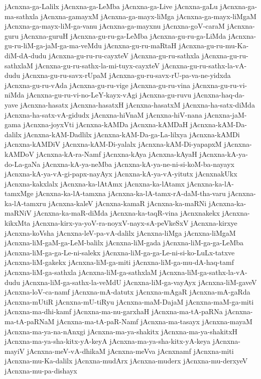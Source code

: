 {jAcnxna-ga-Lalilx
jAcnxna-ga-LeMba
jAcnxna-ga-Live
jAcnxna-gaLu
jAcnxna-ga-ma-sathxla
jAcnxna-gamayxM
jAcnxna-ga-mayx-liMga
jAcnxna-ga-mayx-liMgaM
jAcnxna-ga-mayx-liM-ga-vanu
jAcnxna-ga-mayxnu
jAcnxna-goV-caraM
jAcnxna-guru
jAcnxna-guruH
jAcnxna-gu-ru-ga-LeMba
jAcnxna-gu-ru-ga-LiMda
jAcnxna-gu-ru-liM-ga-jaM-ga-ma-veMdu
jAcnxna-gu-ru-maRtaH
jAcnxna-gu-ru-mu-Ka-diM-dA-dudu
jAcnxna-gu-ru-ru-cayxteV
jAcnxna-gu-ru-sathxla
jAcnxna-gu-ru-sathxlaM
jAcnxna-gu-ru-sathx-la-mi-tuyx-cayxteV
jAcnxna-gu-ru-sathx-la-vA-dudu
jAcnxna-gu-ru-savx-rUpaM
jAcnxna-gu-ru-savx-rU-pa-va-ne-yidxda
jAcnxna-gu-ru-vAda
jAcnxna-gu-ru-vige
jAcnxna-gu-ru-vina
jAcnxna-gu-ru-vi-niMda
jAcnxna-gu-ru-vi-no-LeY-kayx-vAgi
jAcnxna-gu-ruvu
jAcnxna-haq-da-yave
jAcnxna-hasatx
jAcnxna-hasatxH
jAcnxna-hasatxM
jAcnxna-ha-satx-diMda
jAcnxna-ha-satx-vA-gidudx
jAcnxna-hiVnaM
jAcnxna-hiV-nana
jAcnxna-jaM-gama
jAcnxna-joyxVti
jAcnxna-kAMDa
jAcnxna-kAMDaH
jAcnxna-kAM-Da-dalilx
jAcnxna-kAM-Dadlilx
jAcnxna-kAM-Da-ga-La-lilxya
jAcnxna-kAMDi
jAcnxna-kAMDiV
jAcnxna-kAM-Di-yalalx
jAcnxna-kAM-Di-yapapxM
jAcnxna-kAMDoV
jAcnxna-kA-ra-Namf
jAcnxna-kAya
jAcnxna-kAyaH
jAcnxna-kA-ya-do-La-gaNa
jAcnxna-kA-ya-neMba
jAcnxna-kA-ya-ne-ni-si-koM-ba-nayayx
jAcnxna-kA-ya-vA-gi-papx-nayAyx
jAcnxna-kA-ya-vA-yitutx
jAcnxnakUkx
jAcnxna-kakxlalx
jAcnxna-ka-lAtAmx
jAcnxna-ka-lAtamx
jAcnxna-ka-lA-tamxMge
jAcnxna-ka-lA-tamxna
jAcnxna-ka-lA-tamx-rA-daM-tha-varu
jAcnxna-ka-lA-tamxru
jAcnxna-kaleV
jAcnxna-kamaR
jAcnxna-ka-maRNi
jAcnxna-ka-maRNiV
jAcnxna-ka-maR-diMda
jAcnxna-ka-taqR-vina
jAcnxnakekx
jAcnxna-kikxMta
jAcnxna-kirx-ya-yoV-ra-noyxV-nayx-sA-peVkeSxV
jAcnxna-kirxye
jAcnxna-koVsha
jAcnxna-leV-pa-vA-dalilx
jAcnxna-liMga
jAcnxna-liMgaM
jAcnxna-liM-gaM-ga-LeM-balilx
jAcnxna-liM-gada
jAcnxna-liM-ga-ga-LeMba
jAcnxna-liM-ga-ga-Le-ni-salekx
jAcnxna-liM-ga-ga-Le-ni-si-ko-LuLx-tatxve
jAcnxna-liM-gakekx
jAcnxna-liM-ga-miti
jAcnxna-liM-ga-mu-dA-haq-tamf
jAcnxna-liM-ga-sathxla
jAcnxna-liM-ga-sathxlaM
jAcnxna-liM-ga-sathx-la-vA-dudu
jAcnxna-liM-ga-sathx-la-veMdU
jAcnxna-liM-ga-vayAyx
jAcnxna-liM-gaveV
jAcnxna-loV-ca-namf
jAcnxna-mA-datutx
jAcnxna-mAgaR
jAcnxna-mA-gaRda
jAcnxna-mUtiR
jAcnxna-mU-tiRyu
jAcnxna-maM-DajaM
jAcnxna-maM-ga-miti
jAcnxna-ma-dhi-kamf
jAcnxna-ma-nu-garxhaH
jAcnxna-ma-tA-paRNa
jAcnxna-ma-tA-paRNaM
jAcnxna-ma-tA-paR-Namf
jAcnxna-ma-tasayx
jAcnxna-mayaM
jAcnxna-ma-ya-na-nAnxgi
jAcnxna-ma-ya-shakitx
jAcnxna-ma-ya-shakitxH
jAcnxna-ma-ya-sha-kitx-yA-keyA
jAcnxna-ma-ya-sha-kitx-yA-keya
jAcnxna-mayiV
jAcnxna-meV-vA-dhikaM
jAcnxna-meVva
jAcnxnamf
jAcnxna-miti
jAcnxna-mu-Ka-dalilx
jAcnxna-mudArx
jAcnxna-muderx
jAcnxna-mu-derxyeV
jAcnxna-mu-pa-dishayx
}
